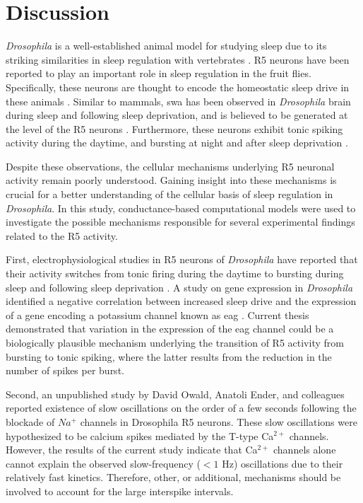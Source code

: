 \documentclass[../main.tex]{subfiles}
\begin{document}
\section{Discussion} \label{sec:discussion}

\textit{Drosophila} is a well-established animal model for studying sleep due to its striking similarities in sleep regulation with vertebrates \parencite{shaferRegulationDrosophilaSleep2021,andreaniCircadianProgrammingEllipsoid2022}. R5 neurons have been reported to play an important role in sleep regulation in the fruit flies. Specifically, these neurons are thought to encode the homeostatic sleep drive in these animals \parencite{liuSleepDriveEncoded2016}. Similar to mammals,
\gls{swa} has been observed in \textit{Drosophila} brain during sleep and following sleep deprivation, and is believed to be generated at the level of the R5 neurons \parencite{raccugliaNetworkSpecificSynchronizationElectrical2019}. Furthermore, these neurons exhibit tonic spiking activity during the daytime, and bursting at night and after sleep deprivation \parencite{suarez-grimaltNeuralArchitectureSleep2021,liuSleepDriveEncoded2016}. 

Despite these observations, the cellular mechanisms underlying R5 neuronal activity remain poorly understood. Gaining insight into these mechanisms is crucial for a better understanding of the cellular basis of sleep regulation in \textit{Drosophila}.
In this study, conductance-based computational models were used to investigate the possible mechanisms responsible for several experimental findings related to the R5 activity.

First, electrophysiological studies in R5 neurons of \textit{Drosophila} have reported that their activity switches from tonic firing during the daytime to bursting during sleep and following sleep deprivation \parencite{liuSleepDriveEncoded2016,suarez-grimaltNeuralArchitectureSleep2021}. A study on gene expression in \textit{Drosophila} identified a negative correlation between increased sleep drive and the expression of a gene encoding a potassium channel known as \gls{eag} \parencite{doppSinglecellTranscriptomicsReveals2024}. Current thesis demonstrated that variation in the expression of the \gls{eag} channel could be a biologically plausible mechanism underlying the transition of R5 activity from bursting to tonic spiking, where the latter results from the reduction in the number of spikes per burst.

Second, an unpublished study by David Owald, Anatoli Ender, and colleagues reported existence of slow oscillations on the order of a few seconds following the blockade of $Na^+$ channels in Drosophila R5 neurons. These slow oscillations were hypothesized to be calcium spikes mediated by the T-type Ca$^{2+}$ channels. However, the results of the current study indicate that Ca$^{2+}$ channels alone cannot explain the observed slow-frequency ($<1$ Hz) oscillations due to their relatively fast kinetics. Therefore, other, or additional, mechanisms should be involved to account for the large interspike intervals.
\end{document}
